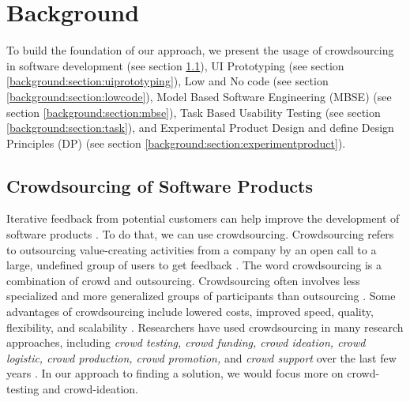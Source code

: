 
\chapter{Background}
\ifpdf
    \graphicspath{{Chapters/Background/Figs/}{Chapters/Background/Figs/}{Chapters/Background/Figs/}}
\else
    \graphicspath{{Chapters/Background/Figs/}{Chapters/Background/Figs/}}
\fi
To build the foundation of our approach, we present the usage of crowdsourcing in software development (see section \ref{background:section:crowdsourcing}), UI Prototyping (see section \ref{background:section:uiprototyping}), Low and No code (see section \ref{background:section:lowcode}), Model Based Software Engineering (MBSE) (see section \ref{background:section:mbse}), Task Based Usability Testing (see section \ref{background:section:task}), and Experimental Product Design and define Design Principles (DP) (see section \ref{background:section:experimentproduct}).

\section{Crowdsourcing of Software Products}
\label{background:section:crowdsourcing}
Iterative feedback from potential customers can help improve the development of software products \cite{article:lean:eric}.
To do that, we can use crowdsourcing.
Crowdsourcing refers to outsourcing value-creating activities from a company by an open call to a large, undefined group of users to get feedback \cite{article:crowdsourcing:leimeister}.
The word crowdsourcing is a combination of crowd and outsourcing.
Crowdsourcing often involves less specialized and more generalized groups of participants than outsourcing \cite{article:crowdsourcing:estelles}.
Some advantages of crowdsourcing include lowered costs, improved speed, quality, flexibility, and scalability \cite{article:crowdsourcing:prpic}.
Researchers have used crowdsourcing in many research approaches, including \textit{crowd testing, crowd funding, crowd ideation, crowd logistic, crowd production, crowd promotion,} and \textit{crowd support} over the last few years \cite{article:crowdsourcing:durward}.
In our approach to finding a solution, we would focus more on crowd-testing and crowd-ideation.

